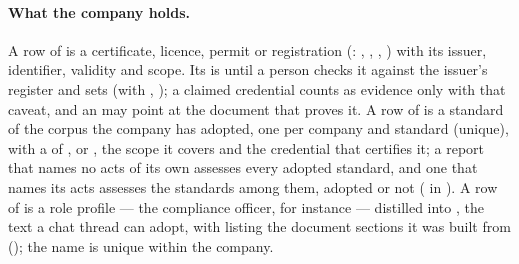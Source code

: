 \paragraph{What the company holds.} A row of  is a certificate,
licence, permit or registration (: , ,
, ) with its issuer, identifier, validity and scope. Its
 is  until a person checks it against the issuer's register and sets
 (with , ); a claimed credential counts as
evidence only with that caveat, and an  may point at the document that
proves it. A row of  is a standard of the corpus the company has adopted,
one per company and standard (unique), with a  of ,
 or , the scope it covers and the credential that certifies
it; a report that names no acts of its own assesses every adopted standard, and one that names
its acts assesses the standards among them, adopted or not ( in
). A row of
 is a role profile --- the compliance officer, for instance --- distilled
into , the text a chat thread can adopt, with  listing the document
sections it was built from (); the name is unique within
the company.

